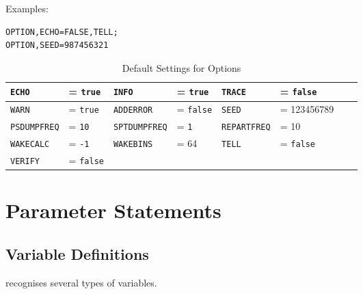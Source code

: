 \noindent Examples:
\begin{verbatim}
OPTION,ECHO=FALSE,TELL;
OPTION,SEED=987456321
\end{verbatim}

\begin{table}[ht] \footnotesize
  \caption{Default Settings for Options}
  \label{tab:option}
  \begin{center}
    \begin{tabular}{|ll|ll|ll|ll|}
      \hline
      \texttt{ECHO}     & = \texttt{true}  &
      \texttt{INFO}     & = \texttt{true}  &
      \texttt{TRACE}    & = \texttt{false} \\
      \hline
      \texttt{WARN}     & = \texttt{true } &
      \texttt{ADDERROR} & = \texttt{false} &
      \texttt{SEED}     & = 123456789      \\
      \hline
       \texttt{PSDUMPFREQ}     & = \texttt{10 } &
      \texttt{SPTDUMPFREQ} & = \texttt{1} &
      \texttt{REPARTFREQ}     & = 10  \\
      \hline
            \texttt{WAKECALC}     & = \texttt{-1 } &
      \texttt{WAKEBINS}     &  = 64 &
        \texttt{TELL}     & = \texttt{false} \\
       \hline
         \texttt{VERIFY}   & = \texttt{false} &
         \texttt{}     &  &
           \texttt{}     & & \\
             \hline
    \end{tabular}
  \end{center}
\end{table}

\section{Parameter Statements}
\label{sec:parameter}

\subsection{Variable Definitions}
\label{sec:variable}
\opal recognises several types of variables.

